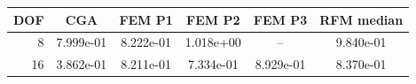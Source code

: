 \begin{tabular}{rccccc}
\toprule
DOF & CGA & FEM P1 & FEM P2 & FEM P3 & RFM median \\
\midrule
8 & 7.999e-01 & 8.222e-01 & 1.018e+00 & -- & 9.840e-01 \\
16 & 3.862e-01 & 8.211e-01 & 7.334e-01 & 8.929e-01 & 8.370e-01 \\
\bottomrule
\end{tabular}
